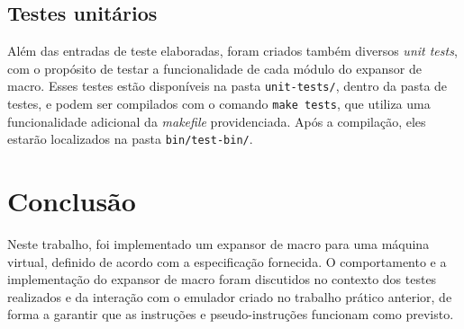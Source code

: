 \documentclass[12pt,a4paper]{article}
\numberwithin{equation}{section}
\begin{document}
\subsection{Testes unitários}

Além das entradas de teste elaboradas, foram criados também diversos \emph{unit tests}, com o propósito de testar a funcionalidade de cada módulo do expansor de macro. Esses testes estão disponíveis na pasta \verb|unit-tests/|, dentro da pasta de testes, e podem ser compilados com o comando \verb|make tests|, que utiliza uma funcionalidade adicional da \emph{makefile} providenciada. Após a compilação, eles estarão localizados na pasta \verb|bin/test-bin/|.

\section{Conclusão}

Neste trabalho, foi implementado um expansor de macro para uma máquina virtual, definido de acordo com a especificação fornecida. O comportamento e a implementação do expansor de macro foram discutidos no contexto dos testes realizados e da interação com o emulador criado no trabalho prático anterior, de forma a garantir que as instruções e pseudo-instruções funcionam como previsto.







\end{document}
